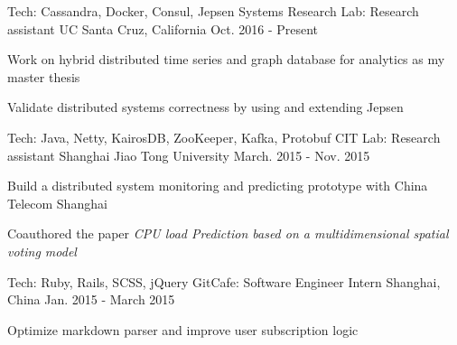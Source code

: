 

\begin{cventries}

  \cventry
    {Tech: Cassandra, Docker, Consul, Jepsen} %
    {Systems Research Lab: Research assistant} %
    {UC Santa Cruz, California} %
    {Oct. 2016 - Present} %
    {
      \begin{cvitems} %
        \item {Work on hybrid distributed time series and graph database for analytics as my master thesis}
        \item {Validate distributed systems correctness by using and extending Jepsen}
      \end{cvitems}
    }

    \cventry
      {Tech: Java, Netty, KairosDB, ZooKeeper, Kafka, Protobuf} %
      {CIT Lab: Research assistant} %
      {Shanghai Jiao Tong University} %
      {March. 2015 - Nov. 2015} %
      {
        \begin{cvitems} %
          \item {Build a distributed system monitoring and predicting prototype with China Telecom Shanghai}
          \item {Coauthored the paper \textit{CPU load Prediction based on a multidimensional spatial voting model}}
        \end{cvitems}
      }


  \cventry
    {Tech: Ruby, Rails, SCSS, jQuery} %
    {GitCafe: Software Engineer Intern} %
    {Shanghai, China} %
    {Jan. 2015 - March 2015} %
    {
      \begin{cvitems} %
        \item {Optimize markdown parser and improve user subscription logic}
      \end{cvitems}
    }


\end{cventries}

